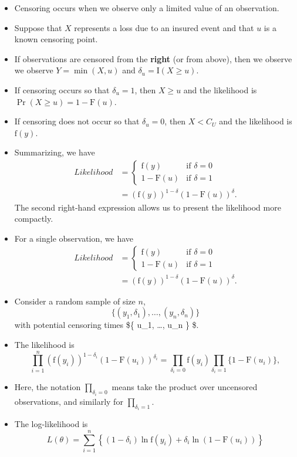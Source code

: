 \documentclass[]{book}
\begin{document}
\begin{itemize}
\item
  Censoring occurs when we observe only a limited value of an
  observation.
\item
  Suppose that \(X\) represents a loss due to an insured event and that
  \(u\) is a known censoring point.
\item
  If observations are censored from the \textbf{right} (or from above),
  then we observe we observe \(Y= \min(X, u)\) and
  \(\delta_u= \mathrm{I}(X \geq u)\).
\item
  If censoring occurs so that \(\delta_u=1\), then \(X \geq u\) and the
  likelihood is \(\Pr(X \ge u) = 1-\mathrm{F}(u)\).
\item
  If censoring does not occur so that \(\delta_u=0\), then \(X < C_U\)
  and the likelihood is \(\mathrm{f}(y)\).
\item
  Summarizing, we have \[\begin{aligned}
  Likelihood  &= \left\{
  \begin{array}{cl}
  \mathrm{f}(y) & \textrm{if~}\delta=0 \\
  1-\mathrm{F}(u)  &  \textrm{if~}\delta=1
  \end{array}\right. \\
  &= \left( \mathrm{f}(y)\right)^{1-\delta} \left(1-\mathrm{F}(u)\right)^{\delta} .\end{aligned}\]
  The second right-hand expression allows us to present the likelihood
  more compactly.
\item
  For a single observation, we have \[\begin{aligned}
  Likelihood  &= \left\{
  \begin{array}{cl}
  \mathrm{f}(y) & \textrm{if~}\delta=0 \\
  1-\mathrm{F}(u)  &  \textrm{if~}\delta=1
  \end{array}\right. \\
  &= \left( \mathrm{f}(y)\right)^{1-\delta} \left(1-\mathrm{F}(u)\right)^{\delta} .\end{aligned}\]
\item
  Consider a random sample of size \(n\),
  \[\{ (y_1,\delta_1), \ldots,(y_n, \delta_n) \} \] with potential
  censoring times \$\{ u\_1, \ldots, u\_n \} \$.
\item
  The likelihood is
  \[\prod_{i=1}^n \left( \mathrm{f}(y_i)\right)^{1-\delta_i} \left(1-\mathrm{F}(u_i)\right)^{\delta_i}
  = \prod_{\delta_i=0}\mathrm{f}(y_i) \prod_{\delta_i=1} \{1-\mathrm{F}(u_i)\},\]
\item
  Here, the notation \(\prod_{\delta_i=0}\) means take the product over
  uncensored observations, and similarly for \(\prod_{\delta_i=1}\).
\item
  The log-likelihood is
  \[L(\theta) = \sum_{i=1}^n \left\{(1-\delta_i) \ln  \mathrm{f}(y_i) +  \delta_i \ln \left(1-\mathrm{F}(u_i)\right) \right\}\]
\end{itemize}
\end{document}
